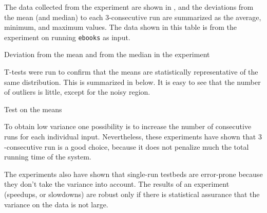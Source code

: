 The data collected from the experiment are shown in , and the deviations from the mean (and median) to each $3$-consecutive run are summarized as the average, minimum, and maximum values. The data shown in this table is from the experiment on \bzip running {\tt ebooks} as input.

\begin{table}
  \centering
  \begin{tiny}
  
  \end{tiny}
  \caption{Deviation from the mean and from the median in the experiment}
  \label{tab:simStats}
\end{table}

T-tests were run to confirm that the means are statistically representative of the same distribution. This is summarized in  below. It is easy to see that the number of outliers is little, except for the noisy region.

\begin{table}
  \centering
  \begin{tiny}
  
  \end{tiny}
  \caption{Test on the means}
  \label{tab:statTest}
\end{table}

To obtain low variance one possibility is to increase the number of consecutive runs for each individual input. Nevertheless, these experiments have shown that $3$-consecutive run is a good choice, because it does not penalize much the total running time of the system.

The experiments also have shown that single-run testbeds are error-prone because they don't take the variance into account. The results of an experiment (speedups, or slowdowns) are robust only if there is statistical assurance that the variance on the data is not large.


